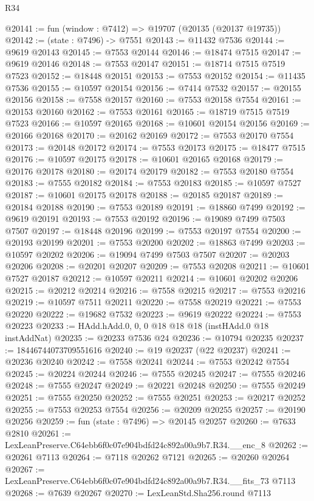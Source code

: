 \begin{lexlean}{R34}
\begin{coremodule}
@20141 := fun (window : @7412) => @19707 (@20135 (@20137 @19735))
@20142 := (state : @7496) -> @7551
@20143 := @11432 @7536
@20144 := @9619 @20143
@20145 := @7553 @20144
@20146 := @18474 @7515
@20147 := @9619 @20146
@20148 := @7553 @20147
@20151 := @18714 @7515 @7519 @7523
@20152 := @18448 @20151
@20153 := @7553 @20152
@20154 := @11435 @7536
@20155 := @10597 @20154
@20156 := @7414 @7532
@20157 := @20155 @20156
@20158 := @7558 @20157
@20160 := @7553 @20158 @7554
@20161 := @20153 @20160
@20162 := @7553 @20161
@20165 := @18719 @7515 @7519 @7523
@20166 := @10597 @20165
@20168 := @10601 @20154 @20156
@20169 := @20166 @20168
@20170 := @20162 @20169
@20172 := @7553 @20170 @7554
@20173 := @20148 @20172
@20174 := @7553 @20173
@20175 := @18477 @7515
@20176 := @10597 @20175
@20178 := @10601 @20165 @20168
@20179 := @20176 @20178
@20180 := @20174 @20179
@20182 := @7553 @20180 @7554
@20183 := @7555 @20182
@20184 := @7553 @20183
@20185 := @10597 @7527
@20187 := @10601 @20175 @20178
@20188 := @20185 @20187
@20189 := @20184 @20188
@20190 := @7553 @20189
@20191 := @18860 @7499
@20192 := @9619 @20191
@20193 := @7553 @20192
@20196 := @19089 @7499 @7503 @7507
@20197 := @18448 @20196
@20199 := @7553 @20197 @7554
@20200 := @20193 @20199
@20201 := @7553 @20200
@20202 := @18863 @7499
@20203 := @10597 @20202
@20206 := @19094 @7499 @7503 @7507
@20207 := @20203 @20206
@20208 := @20201 @20207
@20209 := @7553 @20208
@20211 := @10601 @7527 @20187
@20212 := @10597 @20211
@20214 := @10601 @20202 @20206
@20215 := @20212 @20214
@20216 := @7558 @20215
@20217 := @7553 @20216
@20219 := @10597 @7511 @20211
@20220 := @7558 @20219
@20221 := @7553 @20220
@20222 := @19682 @7532
@20223 := @9619 @20222
@20224 := @7553 @20223
@20233 := HAdd.hAdd.{0, 0, 0} @18 @18 @18 (instHAdd.{0} @18 instAddNat)
@20235 := @20233 @7536 @24
@20236 := @10794 @20235
@20237 := 18446744073709551616
@20240 := @19 @20237 (@22 @20237)
@20241 := @20236 @20240
@20242 := @7558 @20241
@20244 := @7553 @20242 @7554
@20245 := @20224 @20244
@20246 := @7555 @20245
@20247 := @7555 @20246
@20248 := @7555 @20247
@20249 := @20221 @20248
@20250 := @7555 @20249
@20251 := @7555 @20250
@20252 := @7555 @20251
@20253 := @20217 @20252
@20255 := @7553 @20253 @7554
@20256 := @20209 @20255
@20257 := @20190 @20256
@20259 := fun (state : @7496) => @20145 @20257
@20260 := @7633 @2810
@20261 := LexLeanPreserve.C64ebb6f0c07e904bdfd24c892a00a9b7.R34.__enc_8
@20262 := @20261 @7113
@20264 := @7118 @20262 @7121
@20265 := @20260 @20264
@20267 := LexLeanPreserve.C64ebb6f0c07e904bdfd24c892a00a9b7.R34.__fits_73 @7113
@20268 := @7639 @20267
@20270 := LexLeanStd.Sha256.round @7113

\end{coremodule}
\end{lexlean}
